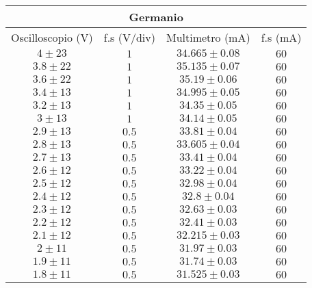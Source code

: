 \documentclass[@MAIN@]{subfile}
\begin{document}
    \begin{tabular}{ ||c|c|c|c|| }
        \hline
        \multicolumn{4}{||c||}{Germanio} \\
        \hline
        Oscilloscopio (V) & f.s (V/div) & Multimetro (mA)  & f.s (mA) \\
        \hline
        $4\pm 23$         & $1$         & $34.665\pm 0.08$ & $60$     \\
        \hline
        $3.8\pm 22$       & $1$         & $35.135\pm 0.07$ & $60$     \\
        \hline
        $3.6\pm 22$       & $1$         & $35.19\pm 0.06$  & $60$     \\
        \hline
        $3.4\pm 13$       & $1$         & $34.995\pm 0.05$ & $60$     \\
        \hline
        $3.2\pm 13$       & $1$         & $34.35\pm 0.05$  & $60$     \\
        \hline
        $3\pm 13$         & $1$         & $34.14\pm 0.05$  & $60$     \\
        \hline
        $2.9\pm 13$       & $0.5$       & $33.81\pm 0.04$  & $60$     \\
        \hline
        $2.8\pm 13$       & $0.5$       & $33.605\pm 0.04$ & $60$     \\
        \hline
        $2.7\pm 13$       & $0.5$       & $33.41\pm 0.04$  & $60$     \\
        \hline
        $2.6\pm 12$       & $0.5$       & $33.22\pm 0.04$  & $60$     \\
        \hline
        $2.5\pm 12$       & $0.5$       & $32.98\pm 0.04$  & $60$     \\
        \hline
        $2.4\pm 12$       & $0.5$       & $32.8\pm 0.04$   & $60$     \\
        \hline
        $2.3\pm 12$       & $0.5$       & $32.63\pm 0.03$  & $60$     \\
        \hline
        $2.2\pm 12$       & $0.5$       & $32.41\pm 0.03$  & $60$     \\
        \hline
        $2.1\pm 12$       & $0.5$       & $32.215\pm 0.03$ & $60$     \\
        \hline
        $2\pm 11$         & $0.5$       & $31.97\pm 0.03$  & $60$     \\
        \hline
        $1.9\pm 11$       & $0.5$       & $31.74\pm 0.03$  & $60$     \\
        \hline
        $1.8\pm 11$       & $0.5$       & $31.525\pm 0.03$ & $60$     \\

\end{tabular}
\end{document}
